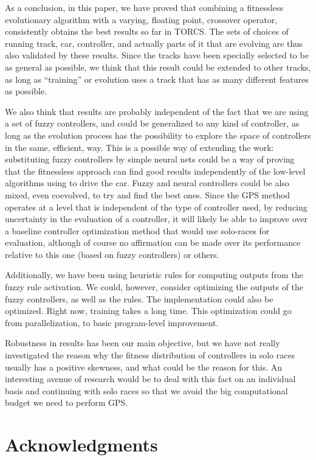 \documentclass[10pt,journal,compsoc]{IEEEtran}
\begin{document}
As a conclusion, in this paper, we have proved that combining a fitnessless evolutionary algorithm with a varying, floating point,
crossover operator, consistently obtains the best results so far in
TORCS. The sets of choices of running track, car, controller, and actually parts of it that are evolving are thus also validated by
these results. Since the tracks have been specially selected to be as
general as possible, we think that this result could be extended to
other tracks, as long as ``training'' or evolution uses a track that
has as many different features as possible.

We also think that results are probably independent of the fact that
we are using a set of fuzzy controllers, and could be
generalized to any kind of controller, as long as the evolution
process has the possibility to explore the space of controllers in the
same, efficient, way. This is a possible way of extending the work:
substituting fuzzy controllers by simple neural nets could be a way of
proving that the fitnessless approach can find good results
independently of the low-level algorithms using to drive the
car. Fuzzy and neural controllers could be also mixed, even coevolved,
to try and find the best ones. Since the GPS method
  operates at a level that is independent of the type of controller used, by
  reducing uncertainty in the evaluation of a controller, it will likely be able to improve over a baseline controller
  optimization method that would use solo-races for evaluation, although of course no affirmation
  can be made over its performance relative to this one (based on
  fuzzy controllers) or others.

Additionally, we have been using heuristic rules for computing outputs
from the fuzzy rule activation. We could, however, consider optimizing
the outputs of the fuzzy controllers, as well as the rules. The implementation could also be optimized. Right now, training takes
a long time. This optimization could go from parallelization, to basic
program-level improvement.

Robustness in results has been our main objective, but
  we have not really investigated the reason why the fitness
  distribution of controllers in solo races usually has a positive
  skewness, and what could be the reason for this. An interesting
  avenue of research would be to deal with this fact on an individual
  basis and continuing with solo races so that we avoid the big   computational budget we need to perform GPS.

\section*{Acknowledgments}
\end{document}
